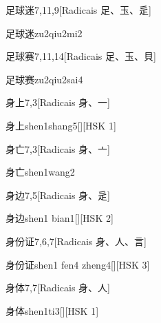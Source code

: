 \begin{entry}{足球迷}{7,11,9}[Radicais ⾜、⽟、⾡]
  \begin{phonetics}{足球迷}{zu2qiu2mi2}
  \end{phonetics}
\end{entry}

\begin{entry}{足球赛}{7,11,14}[Radicais ⾜、⽟、⾙]
  \begin{phonetics}{足球赛}{zu2qiu2sai4}
  \end{phonetics}
\end{entry}

\begin{entry}{身上}{7,3}[Radicais ⾝、⼀]
  \begin{phonetics}{身上}{shen1shang5}[][HSK 1]
  \end{phonetics}
\end{entry}

\begin{entry}{身亡}{7,3}[Radicais ⾝、⼇]
  \begin{phonetics}{身亡}{shen1wang2}
  \end{phonetics}
\end{entry}

\begin{entry}{身边}{7,5}[Radicais ⾝、⾡]
  \begin{phonetics}{身边}{shen1 bian1}[][HSK 2]
  \end{phonetics}
\end{entry}

\begin{entry}{身份证}{7,6,7}[Radicais ⾝、⼈、⾔]
  \begin{phonetics}{身份证}{shen1 fen4 zheng4}[][HSK 3]
  \end{phonetics}
\end{entry}

\begin{entry}{身体}{7,7}[Radicais ⾝、⼈]
  \begin{phonetics}{身体}{shen1ti3}[][HSK 1]
  \end{phonetics}
\end{entry}

